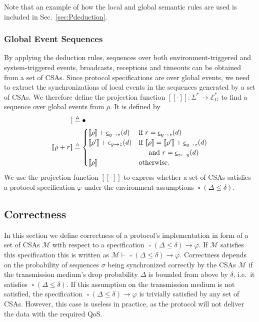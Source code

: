 \documentclass{sig-alternate}
\DeclareMathOperator{\always}{\mathop\square}
\renewcommand{\v}{\varphi}
\newcommand{\e}{\epsilon}
\renewcommand{\d}{\delta}
\newcommand{\dropprob}{\Delta}
\newcommand{\M}{\mathcal{M}}
\newcommand{\G}{\mathcal{E}_G}
\newcommand{\locev}[1]{\underline{#1}}
\newcommand{\proj}[1]{[\![{#1}]\!]}
\newcommand{\glob}[4]{{#1}_{{#2} \rightarrow {#3}}(#4)}
\newcommand{\env}[4]{\locev{#1}_{{#2} \rightarrow {#3}}(#4)}
\newcommand{\sys}[4]{\locev{#1}_{{#2} \leftarrow {#3}}(#4)}
\renewcommand{\sec}[1]{Sec.\ \ref{sec:#1}}
\begin{document}
Note that an example of how the local and global semantic rules are used is included in \sec{Pdeduction}.












\subsubsection{Global Event Sequences}

By applying the deduction rules, sequences over both envi\-ronment-triggered and system-triggered events, broadcasts, receptions and timeouts can be obtained from a set of CSAs. Since protocol specifications are over global events, we need to extract the synchronizations of local events in the sequences generated by a set of CSAs. We therefore define the projection function $\proj{\cdot} : \Sigma^* \rightarrow \G^*$ to find a sequence over global events from $\rho$. It is defined by
\begin{align*}
\proj{\bullet} &\triangleq \bullet\\
\proj{\rho + r} &\triangleq \begin{cases}
	\proj{\rho} + \env{\e}{y}{z}{d} &\text{if}~r = \env{\e}{y}{z}{d} \\
	\proj{\rho'} + \glob{\e}{y}{z}{d}&\text{if}~\proj{\rho} = \proj{\rho'} + \env{\e}{y}{z}{d}\\
	&\hspace{0.5cm}\text{and}~r = \sys{\e}{z}{y}{d}\\
	\proj{\rho} &\text{otherwise}.
\end{cases}
\end{align*}
We use the projection function $\proj{\cdot}$ to express whether a set of CSAs satisfies a protocol specification $\v$ under the environment assumptions $\always(\dropprob \leq \d)$.






\subsection{Correctness} \label{sec:correctness}



In this section we define correctness of a protocol's implementation in form of a set of CSAs $\M$ with respect to a specification $\always(\dropprob \leq \d) \rightarrow \v$. If $\M$ satisfies this specification this is written as $\M \vdash \always(\dropprob \leq \d) \rightarrow  \v$. Correctness depends on the probability of sequences $\sigma$ being synchronized correctly by the CSAs $\M$ if the transmission medium's drop probability $\dropprob$ is bounded from above by $\d$, i.e.\ it satisfies $\always(\dropprob \leq \d)$. If this assumption on the transmission medium is not satisfied, the specification $\always(\dropprob \leq \d) \rightarrow \v$ is trivially satisfied by any set of CSAs. However, this case is useless in practice, as the protocol will not deliver the data with the required QoS.
\end{document}
